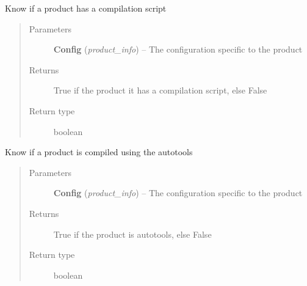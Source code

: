 \documentclass[a4paper,10pt,english]{sphinxmanual}
\begin{document}
\begin{fulllineitems}
\label{commands/apidoc/src:src.product.product_has_script}
Know if a product has a compilation script
\begin{quote}\begin{description}
\item[{Parameters}] \leavevmode
\textbf{Config} (\emph{product\_info}) -- The configuration specific to 
the product

\item[{Returns}] \leavevmode
True if the product it has a compilation script, else False

\item[{Return type}] \leavevmode
boolean

\end{description}\end{quote}

\end{fulllineitems}


\begin{fulllineitems}
\label{commands/apidoc/src:src.product.product_is_autotools}
Know if a product is compiled using the autotools
\begin{quote}\begin{description}
\item[{Parameters}] \leavevmode
\textbf{Config} (\emph{product\_info}) -- The configuration specific to 
the product

\item[{Returns}] \leavevmode
True if the product is autotools, else False

\item[{Return type}] \leavevmode
boolean

\end{description}\end{quote}

\end{fulllineitems}

\end{document}
